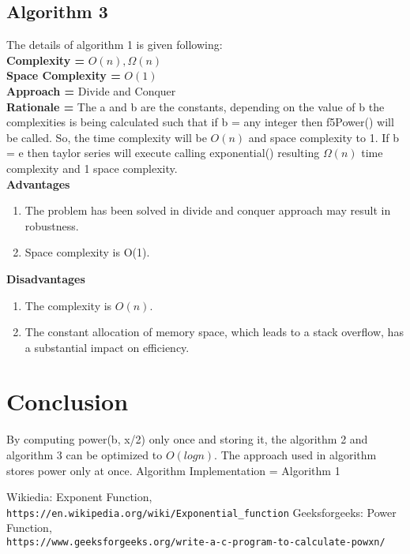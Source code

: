 \documentclass[10pt]{article}
\begin{document}
\subsection{Algorithm 3}
The details of algorithm 1 is given following:
\\\textbf{ Complexity = } $O(n), \Omega(n)$
\\\textbf{Space Complexity = } $O(1)$
\\\textbf{Approach = } Divide and Conquer
\\\textbf{Rationale = } The a and b are the constants, depending on the value of b the complexities is being calculated such that if b = any integer then f5Power() will be called. So, the time complexity will be $O(n)$ and space complexity to 1. If b = e then taylor series will execute calling exponential() resulting $\Omega(n)$ time complexity and 1 space complexity.
\\\textbf{Advantages}
\begin{enumerate}
    \item The problem has been solved in divide and conquer approach may result in robustness.
    \item Space complexity is O(1).
\end{enumerate}
\textbf{Disadvantages}
\begin{enumerate}
    \item The complexity is $O(n)$.
    \item The constant allocation of memory space, which leads to a stack overflow, has a substantial impact on efficiency. 
\end{enumerate}

\section{Conclusion}
By computing power(b, x/2) only once and storing it, the algorithm 2 and algorithm 3 can be optimized to $O(logn)$. The approach used in algorithm stores power only at once.
Algorithm Implementation = Algorithm 1

\begin{thebibliography}{}
Wikiedia: Exponent Function,
\\\texttt{https://en.wikipedia.org/wiki/Exponential\_function}
Geeksforgeeks: Power Function,
\\\texttt{https://www.geeksforgeeks.org/write-a-c-program-to-calculate-powxn/}
\end{thebibliography}
\end{document}
